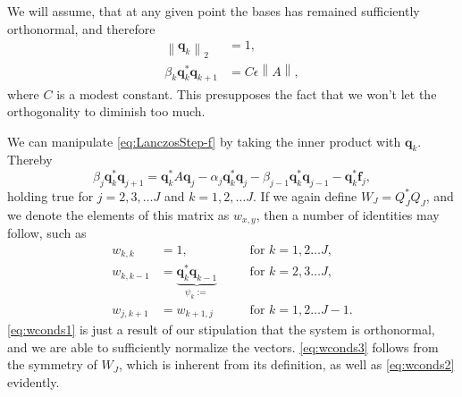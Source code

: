\documentclass{article}
\begin{document}
	We will assume, that at any given point the bases has remained sufficiently orthonormal, and therefore 
	\begin{align}
		\left\lVert \textbf{q}_k \right\rVert_2 &= 1,\\
		\beta_{k} \textbf{q}_k^\ast \textbf{q}_{k+1} &= C \epsilon \left\lVert A \right\rVert,
	\end{align}
	where $C$ is a modest constant. This presupposes the fact that we won't let the orthogonality to diminish too much.
	
	We can manipulate \autoref{eq:LanczosStep-f} by taking the inner product with $\textbf{q}_k$. Thereby
	\begin{equation}\label{eq:reccurence-mult}
		\beta_j\mathbf{q}_k^*\mathbf{q}_{j+1}=\mathbf{q}_k^*A\mathbf{q}_j-\alpha_j\mathbf{q}_k^*\mathbf{q}_j-\beta_{j-1}\mathbf{q}_k^*\mathbf{q}_{j-1} - \mathbf{q}_k^*\textbf{f}_j,
	\end{equation}
	holding true for $j=2,3,\dots J$ and $k=1,2, \dots J$. If we again define $W_J = Q_J^\ast Q_J$, and we denote the elements of this matrix as $w_{x,y}$, then a number of identities may follow, such as 
	\begin{align}
		w_{k,k} &=  1, \quad&&\mathrm{for}\,\, k = 1,2 \dots J\label{eq:wconds1}, \\
		w_{k,k-1} &= \underbrace{\textbf{q}_k^\ast \textbf{q}_{k-1}}_{\psi_k := } \quad&&\mathrm{for}\,\, k = 2,3 \dots J\label{eq:wconds2}, \\
		w_{j,k+1} &=  w_{k+1, j}\quad&&\mathrm{for}\,\, k = 1,2 \dots J-1\label{eq:wconds3}.
	\end{align}
	\autoref{eq:wconds1} is just a result of our stipulation that the system is orthonormal, and we are able to sufficiently normalize the vectors. \autoref{eq:wconds3} follows from the symmetry of $W_{J}$, which is inherent from its definition, as well as \autoref{eq:wconds2} evidently.
	
\end{document}
